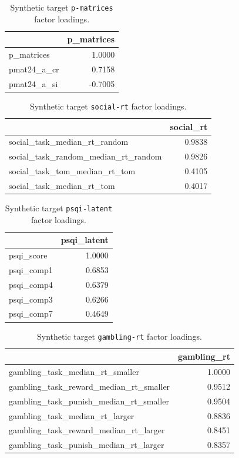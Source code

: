 \documentclass{article}
\begin{document}
\begin{table}[H]
\caption{Synthetic target \texttt{p-matrices} factor loadings.}\label{tab:p-matrices}
\centering
\begin{tabular}{lr}
\toprule
 & p\_matrices \\
\midrule
p\_matrices & 1.0000 \\
pmat24\_a\_cr & 0.7158 \\
pmat24\_a\_si & -0.7005 \\
\bottomrule
\end{tabular}

\end{table}


\begin{table}[H]
\caption{Synthetic target \texttt{social-rt} factor loadings.}\label{tab:social-rt}
\centering
\begin{tabular}{lr}
\toprule
 & social\_rt \\
\midrule
social\_task\_median\_rt\_random & 0.9838 \\
social\_task\_random\_median\_rt\_random & 0.9826 \\
social\_task\_tom\_median\_rt\_tom & 0.4105 \\
social\_task\_median\_rt\_tom & 0.4017 \\
\bottomrule
\end{tabular}

\end{table}


\begin{table}[H]
\caption{Synthetic target \texttt{psqi-latent} factor loadings.}\label{tab:psqi-latent}
\centering
\begin{tabular}{lr}
\toprule
 & psqi\_latent \\
\midrule
psqi\_score & 1.0000 \\
psqi\_comp1 & 0.6853 \\
psqi\_comp4 & 0.6379 \\
psqi\_comp3 & 0.6266 \\
psqi\_comp7 & 0.4649 \\
\bottomrule
\end{tabular}

\end{table}


\begin{table}[H]
\caption{Synthetic target \texttt{gambling-rt} factor loadings.}\label{tab:gambling-rt}
\centering
\begin{tabular}{lr}
\toprule
 & gambling\_rt \\
\midrule
gambling\_task\_median\_rt\_smaller & 1.0000 \\
gambling\_task\_reward\_median\_rt\_smaller & 0.9512 \\
gambling\_task\_punish\_median\_rt\_smaller & 0.9504 \\
gambling\_task\_median\_rt\_larger & 0.8836 \\
gambling\_task\_reward\_median\_rt\_larger & 0.8451 \\
gambling\_task\_punish\_median\_rt\_larger & 0.8357 \\
\bottomrule
\end{tabular}

\end{table}
\end{document}
